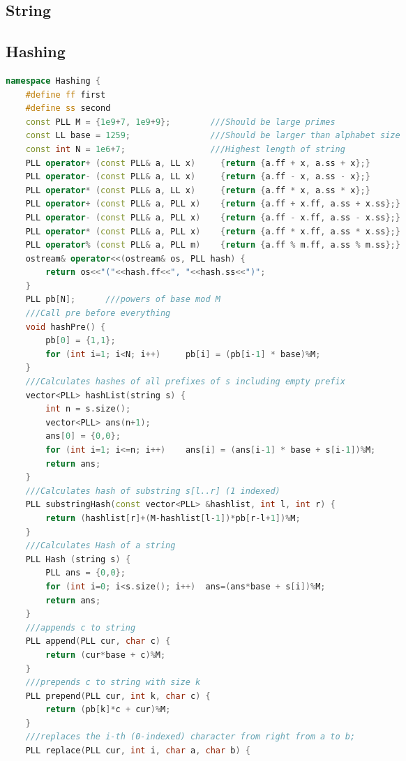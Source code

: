 \documentclass[10pt,a4paper,landscape]{article}
\begin{document}
\begin{multicols}{3}
\section{String}

\subsection{Hashing}
\begin{lstlisting}[language=C++, breaklines=true]
namespace Hashing {
    #define ff first
    #define ss second
    const PLL M = {1e9+7, 1e9+9};        ///Should be large primes
    const LL base = 1259;                ///Should be larger than alphabet size
    const int N = 1e6+7;                 ///Highest length of string
    PLL operator+ (const PLL& a, LL x)     {return {a.ff + x, a.ss + x};}
    PLL operator- (const PLL& a, LL x)     {return {a.ff - x, a.ss - x};}
    PLL operator* (const PLL& a, LL x)     {return {a.ff * x, a.ss * x};}
    PLL operator+ (const PLL& a, PLL x)    {return {a.ff + x.ff, a.ss + x.ss};}
    PLL operator- (const PLL& a, PLL x)    {return {a.ff - x.ff, a.ss - x.ss};}
    PLL operator* (const PLL& a, PLL x)    {return {a.ff * x.ff, a.ss * x.ss};}
    PLL operator% (const PLL& a, PLL m)    {return {a.ff % m.ff, a.ss % m.ss};}
    ostream& operator<<(ostream& os, PLL hash) {
        return os<<"("<<hash.ff<<", "<<hash.ss<<")";
    }
    PLL pb[N];      ///powers of base mod M
    ///Call pre before everything
    void hashPre() {
        pb[0] = {1,1};
        for (int i=1; i<N; i++)     pb[i] = (pb[i-1] * base)%M;
    }
    ///Calculates hashes of all prefixes of s including empty prefix
    vector<PLL> hashList(string s) {
        int n = s.size();
        vector<PLL> ans(n+1);
        ans[0] = {0,0};
        for (int i=1; i<=n; i++)    ans[i] = (ans[i-1] * base + s[i-1])%M;
        return ans;
    }
    ///Calculates hash of substring s[l..r] (1 indexed)
    PLL substringHash(const vector<PLL> &hashlist, int l, int r) {
        return (hashlist[r]+(M-hashlist[l-1])*pb[r-l+1])%M;
    }
    ///Calculates Hash of a string
    PLL Hash (string s) {
        PLL ans = {0,0};
        for (int i=0; i<s.size(); i++)  ans=(ans*base + s[i])%M;
        return ans;
    }
    ///appends c to string
    PLL append(PLL cur, char c) {
        return (cur*base + c)%M;
    }
    ///prepends c to string with size k
    PLL prepend(PLL cur, int k, char c) {
        return (pb[k]*c + cur)%M;
    }
    ///replaces the i-th (0-indexed) character from right from a to b;
    PLL replace(PLL cur, int i, char a, char b) {

\end{lstlisting}
\end{multicols}
\end{document}
